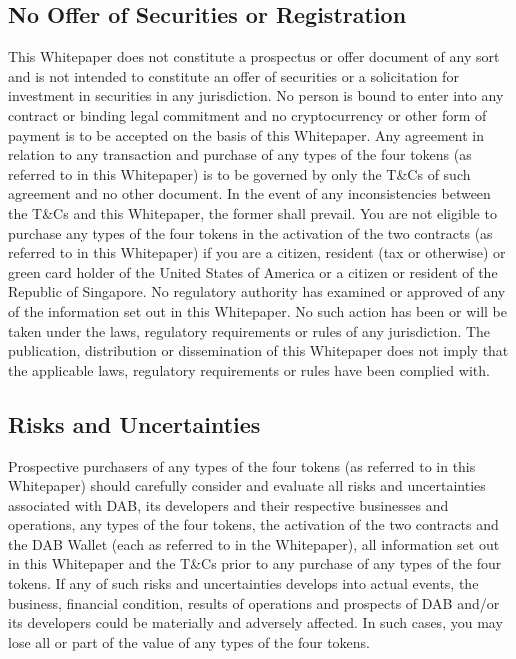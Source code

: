 \documentclass[review]{elsarticle}
\begin{document}
\subsection{No Offer of Securities or Registration}
This Whitepaper does not constitute a prospectus or offer document of any sort and is not intended to constitute an offer of securities or a solicitation for investment in securities in any jurisdiction. No person is bound to enter into any contract or binding legal commitment and no cryptocurrency or other form of payment is to be accepted on the basis of this Whitepaper. Any agreement in relation to any transaction and purchase of any types of the four tokens (as referred to in this Whitepaper) is to be governed by only the T\&Cs of such agreement and no other document. In the event of any inconsistencies between the T\&Cs and this Whitepaper, the former shall prevail. 
You are not eligible to purchase any types of the four tokens in the activation of the two contracts (as referred to in this Whitepaper) if you are a citizen, resident (tax or otherwise) or green card holder of the United States of America or a citizen or resident of the Republic of Singapore. 
No regulatory authority has examined or approved of any of the information set out in this Whitepaper. No such action has been or will be taken under the laws, regulatory requirements or rules of any jurisdiction. The publication, distribution or dissemination of this Whitepaper does not imply that the applicable laws, regulatory requirements or rules have been complied with.

\subsection{Risks and Uncertainties}
Prospective purchasers of any types of the four tokens (as referred to in this Whitepaper) should carefully consider and evaluate all risks and uncertainties associated with DAB, its developers and their respective businesses and operations, any types of the four tokens, the activation of the two contracts and the DAB Wallet (each as referred to in the Whitepaper), all information set out in this Whitepaper and the T\&Cs prior to any purchase of any types of the four tokens. If any of such risks and uncertainties develops into actual events, the business, financial condition, results of operations and prospects of DAB and/or its developers could be materially and adversely affected. In such cases, you may lose all or part of the value of any types of the four tokens.
\end{document}
